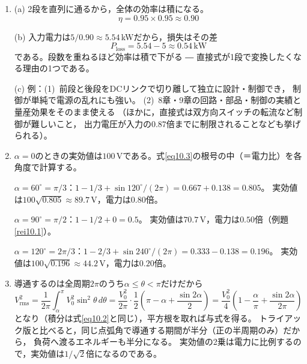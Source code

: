 \answer
\begin{enumerate}

\item[\ref{ex10.1}]
(a) 2段を直列に通るから，全体の効率は積になる。
\begin{equation*}
\eta = 0.95 \times 0.95 \approx 0.90
\end{equation*}

(b) 入力電力は$5/0.90 \approx 5.54$\,kWだから，損失はその差
\begin{equation*}
P_{\mathrm{loss}} = 5.54 - 5 \approx 0.54\,\mathrm{kW}
\end{equation*}
である。段数を重ねるほど効率は積で下がる ― 直接式が1段で変換したくなる理由の1つである。

(c) 例：(1)~前段と後段をDCリンクで切り離して独立に設計・制御でき，
制御が単純で電源の乱れにも強い。
(2)~8章・9章の回路・部品・制御の実績と量産効果をそのまま使える
（ほかに，直接式は双方向スイッチの転流など制御が難しいこと，
出力電圧が入力の$0.87$倍までに制限されることなども挙げられる）。

\item[\ref{ex10.2}]
$\alpha = 0$のときの実効値は$100$\,Vである。式\ref{eq10.3}の根号の中（＝電力比）を各角度で計算する。

$\alpha = 60^\circ = \pi/3$：$1 - 1/3 + \sin 120^\circ/(2\pi) = 0.667 + 0.138 = 0.805$。
実効値は$100\sqrt{0.805} \approx 89.7$\,V，電力は$0.80$倍。

$\alpha = 90^\circ = \pi/2$：$1 - 1/2 + 0 = 0.5$。
実効値は$70.7$\,V，電力は$0.50$倍（例題\ref{rei10.1}）。

$\alpha = 120^\circ = 2\pi/3$：$1 - 2/3 + \sin 240^\circ/(2\pi) = 0.333 - 0.138 = 0.196$。
実効値は$100\sqrt{0.196} \approx 44.2$\,V，電力は$0.20$倍。

\item[\ref{ex10.3}]
導通するのは全周期$2\pi$のうち$\alpha \le \theta < \pi$だけだから
\begin{equation*}
V_{\mathrm{rms}}^2 = \frac{1}{2\pi} \int_\alpha^{\pi} V_0^2 \sin^2\theta\, d\theta
= \frac{V_0^2}{2\pi} \cdot \frac{1}{2}\left(\pi - \alpha + \frac{\sin 2\alpha}{2}\right)
= \frac{V_0^2}{4}\left(1 - \frac{\alpha}{\pi} + \frac{\sin 2\alpha}{2\pi}\right)
\end{equation*}
となり（積分は式\ref{eq10.2}と同じ），平方根を取れば与式を得る。
トライアック版と比べると，同じ点弧角で導通する期間が半分（正の半周期のみ）だから，
負荷へ渡るエネルギーも半分になる。
実効値の2乗は電力に比例するので，実効値は$1/\sqrt{2}$倍になるのである。


\end{enumerate}
